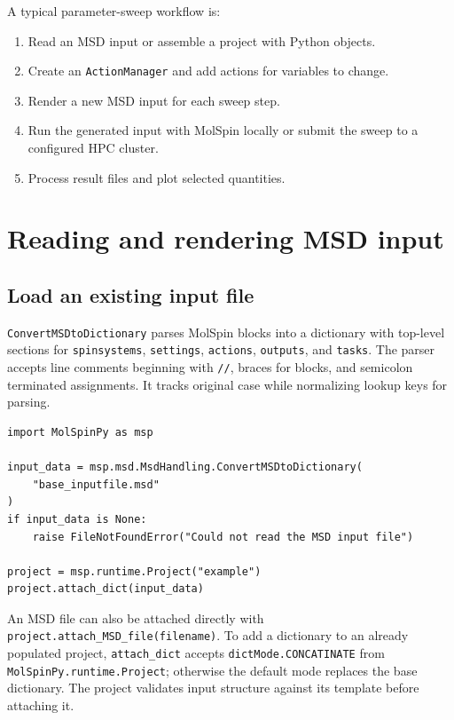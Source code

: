 \documentclass[11pt,a4paper]{article}
\begin{document}
A typical parameter-sweep workflow is:
\begin{enumerate}[nosep]
  \item Read an MSD input or assemble a project with Python objects.
  \item Create an \texttt{ActionManager} and add actions for variables to
        change.
  \item Render a new MSD input for each sweep step.
  \item Run the generated input with MolSpin locally or submit the sweep to
        a configured HPC cluster.
  \item Process result files and plot selected quantities.
\end{enumerate}

\section{Reading and rendering MSD input}

\subsection{Load an existing input file}

\texttt{ConvertMSDtoDictionary} parses MolSpin blocks into a dictionary with
top-level sections for \texttt{spinsystems}, \texttt{settings},
\texttt{actions}, \texttt{outputs}, and \texttt{tasks}. The parser accepts
line comments beginning with \texttt{//}, braces for blocks, and semicolon
terminated assignments. It tracks original case while normalizing lookup
keys for parsing.

\begin{lstlisting}
import MolSpinPy as msp

input_data = msp.msd.MsdHandling.ConvertMSDtoDictionary(
    "base_inputfile.msd"
)
if input_data is None:
    raise FileNotFoundError("Could not read the MSD input file")

project = msp.runtime.Project("example")
project.attach_dict(input_data)
\end{lstlisting}

An MSD file can also be attached directly with
\texttt{project.attach\_MSD\_file(filename)}. To add a dictionary to an
already populated project, \texttt{attach\_dict} accepts
\texttt{dictMode.CONCATINATE} from
\texttt{MolSpinPy.runtime.Project}; otherwise the default mode replaces the
base dictionary. The project validates input structure against its template
before attaching it.
\end{document}
